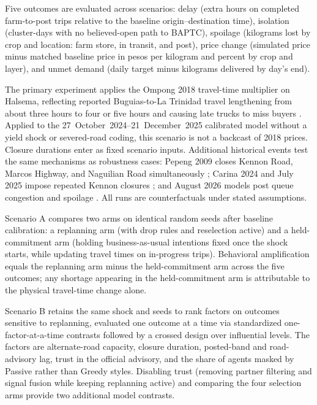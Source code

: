\documentclass{icsthesis}
\begin{document}
\begin{mainmatter}
			Five outcomes are evaluated across scenarios: delay (extra hours on completed farm-to-post trips relative to the baseline origin--destination time), isolation (cluster-days with no believed-open path to BAPTC), spoilage (kilograms lost by crop and location: farm store, in transit, and post), price change (simulated price minus matched baseline price in pesos per kilogram and percent by crop and layer), and unmet demand (daily target minus kilograms delivered by day's end).

			The primary experiment applies the Ompong 2018 travel-time multiplier on Halsema, reflecting reported Buguias-to-La Trinidad travel lengthening from about three hours to four or five hours and causing late trucks to miss buyers \citep{PNA2018,Espiritu2018}. Applied to the 27~October~2024--21~December~2025 calibrated model without a yield shock or severed-road coding, this scenario is not a backcast of 2018 prices. Closure durations enter as fixed scenario inputs. Additional historical events test the same mechanisms as robustness cases: Pepeng 2009 closes Kennon Road, Marcos Highway, and Naguilian Road simultaneously \citep{GMANews2009}; Carina 2024 and July 2025 impose repeated Kennon closures \citep{Rappler2024,PIA2025}; and August 2026 models post queue congestion and spoilage \citep{AntonioDumlao2026}. All runs are counterfactuals under stated assumptions.

			Scenario A compares two arms on identical random seeds after baseline calibration: a replanning arm (with drop rules and reselection active) and a held-commitment arm (holding business-as-usual intentions fixed once the shock starts, while updating travel times on in-progress trips). Behavioral amplification equals the replanning arm minus the held-commitment arm across the five outcomes; any shortage appearing in the held-commitment arm is attributable to the physical travel-time change alone.

			Scenario B retains the same shock and seeds to rank factors on outcomes sensitive to replanning, evaluated one outcome at a time via standardized one-factor-at-a-time contrasts followed by a crossed design over influential levels. The factors are alternate-road capacity, closure duration, posted-band and road-advisory lag, trust in the official advisory, and the share of agents masked by Passive rather than Greedy styles. Disabling trust (removing partner filtering and signal fusion while keeping replanning active) and comparing the four selection arms provide two additional model contrasts.


\end{mainmatter}
\end{document}

